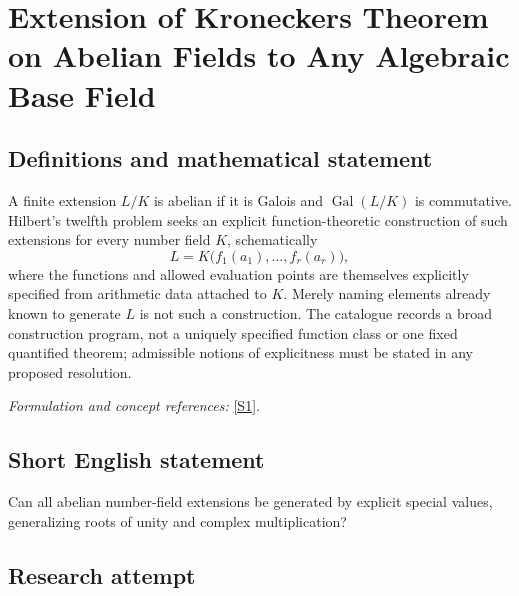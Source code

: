 \documentclass[11pt,a4paper]{article}
\newcommand{\sref}[2]{\hyperlink{source:#1:#2}{[S#2]}}
\newif\ifshowcatalogue
\newcommand{\cataloguescope}[1]{\ifshowcatalogue
 \paragraph{Exact scope in the supplied catalogue.}
 \begin{quote}\small #1\end{quote}\fi}
\numberwithin{equation}{section}
\begin{document}
\setcounter{section}{35}
\clearpage
\section{\texorpdfstring{Extension of Kroneckers Theorem on Abelian Fields to Any Algebraic Base Field}{Extension of Kroneckers Theorem on Abelian Fields to Any Algebraic Base Field}}\label{36}
\subsection{Definitions and mathematical statement}
A finite extension $L/K$ is abelian if it is Galois and $\operatorname{Gal}(L/K)$ is commutative. Hilbert's twelfth problem seeks an explicit function-theoretic construction of such extensions for every number field $K$, schematically
\[
 L=K\bigl(f_1(a_1),\ldots,f_r(a_r)\bigr),
\]
where the functions and allowed evaluation points are themselves explicitly specified from arithmetic data attached to $K$. Merely naming elements already known to generate $L$ is not such a construction. The catalogue records a broad construction program, not a uniquely specified function class or one fixed quantified theorem; admissible notions of explicitness must be stated in any proposed resolution.
\par\smallskip\textit{Formulation and concept references:} \sref{36}{1}.
\cataloguescope{For each number field K, construct generators for its finite abelian extensions as special values of explicitly defined analytic or arithmetic functions associated with K, extending roots of unity over Q and complex multiplication over imaginary quadratic fields.}
\subsection{Short English statement}
Can all abelian number-field extensions be generated by explicit special values, generalizing roots of unity and complex multiplication?
\subsection{Research attempt}
\end{document}
